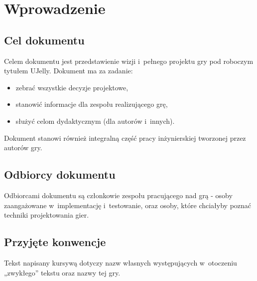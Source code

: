 \chapter{Wprowadzenie}

\section{Cel dokumentu}
Celem dokumentu jest przedstawienie wizji i~pełnego projektu gry pod roboczym
tytułem UJelly. Dokument ma za zadanie:
\begin{itemize}
\item zebrać wszystkie decyzje projektowe,
\item stanowić informacje dla zespołu realizującego grę,
\item służyć celom dydaktycznym (dla autorów i~innych).
\end{itemize}
Dokument stanowi również integralną część pracy inżynierskiej tworzonej przez autorów gry.

\section{Odbiorcy dokumentu}
Odbiorcami dokumentu są członkowie zespołu pracującego nad grą - osoby zaangażowane w~implementację i~testowanie, oraz osoby, które chciałyby poznać techniki projektowania gier.

\section{Przyjęte konwencje}
Tekst napisany kursywą dotyczy nazw własnych występujących w~otoczeniu „zwykłego” tekstu oraz nazwy tej gry.
